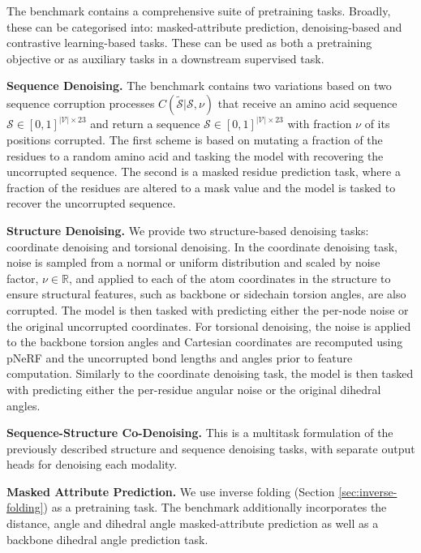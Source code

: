 The benchmark contains a comprehensive suite of pretraining tasks. Broadly, these can be categorised into: masked-attribute prediction, denoising-based and contrastive learning-based tasks. These can be used as both a pretraining objective or as auxiliary tasks in a downstream supervised task.

\textbf{Sequence Denoising. } The benchmark contains two variations based on two sequence corruption processes $C(\tilde{\mathcal{S}} | \mathcal{S}, \nu)$ that receive an amino acid sequence $\mathcal{S} \in [0, 1]^{|\mathcal{V}| \times 23 }$ and return a sequence $\mathcal{S} \in [0, 1]^{|\mathcal{V}| \times 23 }$ with fraction $\nu$ of its positions corrupted. The first scheme is based on mutating a fraction of the residues to a random amino acid and tasking the model with recovering the uncorrupted sequence. The second is a masked residue prediction task, where a fraction of the residues are altered to a mask value and the model is tasked to recover the uncorrupted sequence.

\textbf{Structure Denoising. } We provide two structure-based denoising tasks: coordinate denoising and torsional denoising. In the coordinate denoising task, noise is sampled from a normal or uniform distribution and scaled by noise factor, $\nu \in \mathbb{R}$, and applied to each of the atom coordinates in the structure to ensure structural features, such as backbone or sidechain torsion angles, are also corrupted. The model is then tasked with predicting either the per-node noise or the original uncorrupted coordinates. For torsional denoising, the noise is applied to the backbone torsion angles and Cartesian coordinates are recomputed using pNeRF \citep{AlQuraishi2019} and the uncorrupted bond lengths and angles prior to feature computation. Similarly to the coordinate denoising task, the model is then tasked with predicting either the per-residue angular noise or the original dihedral angles.

\textbf{Sequence-Structure Co-Denoising. } This is a multitask formulation of the previously described structure and sequence denoising tasks, with separate output heads for denoising each modality.

\textbf{Masked Attribute Prediction. } 
We use inverse folding (Section \ref{sec:inverse-folding}) as a pretraining task.
The benchmark additionally incorporates the distance, angle and dihedral angle masked-attribute prediction \citep{zhang2023protein} as well as a backbone dihedral angle prediction task.

